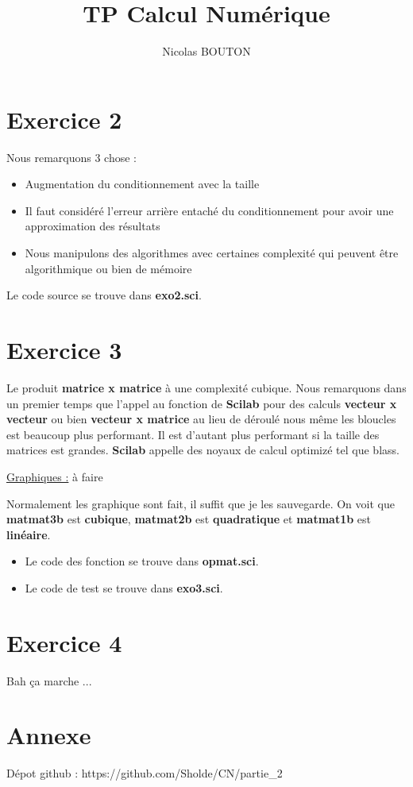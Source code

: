 \documentclass{article}
\title{TP Calcul Numérique}
\author{Nicolas BOUTON}
\begin{document}
\maketitle

\section*{Exercice 2}

Nous remarquons 3 chose :

\begin{itemize}
\item Augmentation du conditionnement avec la taille
\item Il faut considéré l'erreur arrière entaché du conditionnement
  pour avoir une approximation des résultats
\item Nous manipulons des algorithmes avec certaines complexité qui
  peuvent être algorithmique ou bien de mémoire
\end{itemize}

Le code source se trouve dans \textbf{exo2.sci}.

\section*{Exercice 3}

Le produit \textbf{matrice x matrice} à une complexité cubique.
Nous remarquons dans un premier temps que l'appel au fonction de
\textbf{Scilab} pour des calculs \textbf{vecteur x vecteur} ou bien
\textbf{vecteur x matrice} au lieu de déroulé nous même les bloucles
est beaucoup plus performant. Il est d'autant plus performant si la
taille des matrices est grandes. \textbf{Scilab} appelle des noyaux de
calcul optimizé tel que blass. \newline

\underline{Graphiques :} à faire \newline

Normalement les graphique sont fait, il suffit que je les
sauvegarde. On voit que \textbf{matmat3b} est \textbf{cubique},
\textbf{matmat2b} est \textbf{quadratique} et \textbf{matmat1b} est
\textbf{linéaire}.

\begin{itemize}
\item Le code des fonction se trouve dans \textbf{opmat.sci}.
\item Le code de test se trouve dans \textbf{exo3.sci}.
\end{itemize}

\section*{Exercice 4}

Bah ça marche ...

\section*{Annexe}

Dépot github : https://github.com/Sholde/CN/partie\_2
\end{document}
